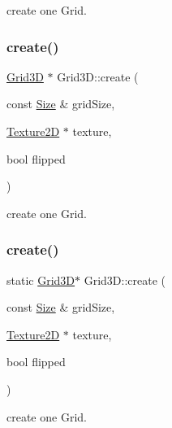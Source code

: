 create one Grid. \mbox{\label{classGrid3D_a509ede1d9d837c1f6a7b304809944649}} 
\subsubsection{\texorpdfstring{create()}{create()}\hspace{0.1cm}{\footnotesize\ttfamily [5/8]}}
{\footnotesize\ttfamily \hyperlink{classGrid3D}{Grid3D} $\ast$ Grid3\+D\+::create (\begin{DoxyParamCaption}\item[{const \hyperlink{classSize}{Size} \&}]{grid\+Size,  }\item[{\hyperlink{classTexture2D}{Texture2D} $\ast$}]{texture,  }\item[{bool}]{flipped }\end{DoxyParamCaption})\hspace{0.3cm}{\ttfamily [static]}}

create one Grid. \mbox{\label{classGrid3D_a555f0b6973f70a969a43b2bfa5ff1900}} 
\subsubsection{\texorpdfstring{create()}{create()}\hspace{0.1cm}{\footnotesize\ttfamily [6/8]}}
{\footnotesize\ttfamily static \hyperlink{classGrid3D}{Grid3D}$\ast$ Grid3\+D\+::create (\begin{DoxyParamCaption}\item[{const \hyperlink{classSize}{Size} \&}]{grid\+Size,  }\item[{\hyperlink{classTexture2D}{Texture2D} $\ast$}]{texture,  }\item[{bool}]{flipped }\end{DoxyParamCaption})\hspace{0.3cm}{\ttfamily [static]}}

create one Grid. \mbox{\label{classGrid3D_a1204eaea469d9cafd34f76acf0504a16}} 
